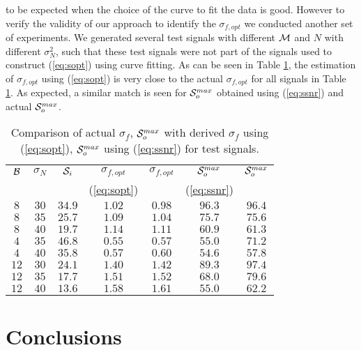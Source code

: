 \documentclass[journal,onecolumn]{IEEEtran}
\newcommand{\Noise}{N}
\newcommand{\g}{f}
\renewcommand{\S}{{\cal S}}
\newcommand{\BW}{{\cal B}}
\newcommand{\flength}{{\cal M}}
\begin{document}
to be expected when the choice of the curve to fit the data is good. 
However to verify the validity of our approach to identify the $\sigma_{\g,opt}$
we conducted another set of experiments. We generated several 
test
signals with different $\flength$ and
$\Noise$ with different $\sigma_\Noise^2$, such that these test 
signals were not part of the signals used to
construct (\ref{eq:sopt}) using curve fitting.  As can be seen in Table
\ref{tab:table2}, the estimation of $\sigma_{\g,opt}$ using (\ref{eq:sopt}) is very
close to the actual $\sigma_{\g,opt}$ for all signals in Table \ref{tab:table2}. 
As expected, a similar match is seen for $\S_o^{max}$ obtained using 
(\ref{eq:ssnr}) and actual  $\S_o^{max}$.
\begin{small}
\begin{table}
\begin{center}
\begin{tabular}{|c|c|c|c|c|c|c|}
\hline \hline
$\BW$ & $\sigma_\Noise$ & $\S_i$ &
$\sigma_{\g,opt}$  &  $\sigma_{\g,opt}$&
$\S_{o}^{max}$ & $\S_{o}^{max}$ \\
 &  &  &  (\ref{eq:sopt}) &  & (\ref{eq:ssnr})&  \\
\hline \hline
$8$ & $30$ & $34.9$ & $1.02$ & $0.98$ & $96.3$ & $96.4$ \\ \hline
$8$ & $35$ & $25.7$ & $1.09$ & $1.04$ & $75.7$ & $75.6$ \\ \hline
$8$ & $40$ & $19.7$ & $1.14$ & $1.11$ & $60.9$ & $61.3$ \\ \hline \hline 
$4$ & $35$ & $46.8$ & $0.55$ & $0.57$ & $55.0$ & $71.2$ \\ \hline
$4$ & $40$ & $35.8$ & $0.57$ & $0.60$ & $54.6$ & $57.8$ \\ \hline \hline
$12$ & $30$ & $24.1$ &$ 1.40$ & $1.42$ & $89.3$ & $97.4$ \\ \hline
$12$ & $35$ & $17.7$ & $1.51$ & $1.52$ & $68.0$ & $79.6$ \\ \hline
$12$ & $40$ & $13.6$ & $1.58$ & $1.61$ & $55.0$ & $62.2$ \\ \hline
\end{tabular}
\caption{Comparison of actual $\sigma_\g$, $\S_o^{max}$ with derived
$\sigma_\g$ using (\ref{eq:sopt}), $\S_o^{max}$ using (\ref{eq:ssnr}) for test
signals.}
\label{tab:table2}
\end{center}
\end{table}
\end{small}

\section{Conclusions}
\label{sec:conclusions}
\end{document}
